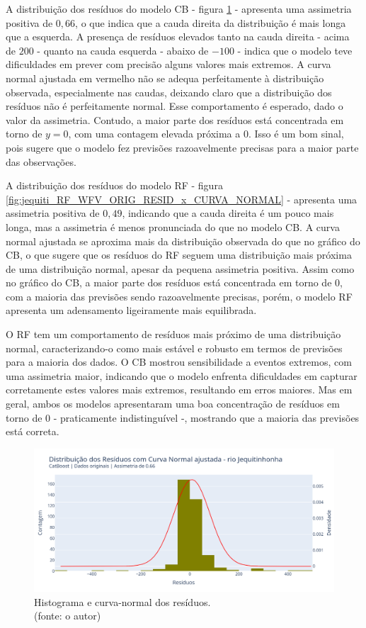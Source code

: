 A distribuição dos resíduos do modelo CB - figura \ref{fig:jequiti_CB_WFV_ORIG_RESID_x_CURVA_NORMAL} - apresenta uma assimetria positiva de $0,66$, o que indica que a cauda direita da distribuição é mais longa que a esquerda. A presença de resíduos elevados tanto na cauda direita - acima de $200$ - quanto na cauda esquerda - abaixo de $-100$ - indica que o modelo teve dificuldades em prever com precisão alguns valores mais extremos. A curva normal ajustada em vermelho não se adequa perfeitamente à distribuição observada, especialmente nas caudas, deixando claro que a distribuição dos resíduos não é perfeitamente normal. Esse comportamento é esperado, dado o valor da assimetria. Contudo, a maior parte dos resíduos está concentrada em torno de $y=0$, com uma contagem elevada próxima a $0$. Isso é um bom sinal, pois sugere que o modelo fez previsões razoavelmente precisas para a maior parte das observações.

A distribuição dos resíduos do modelo RF - figura \ref{fig:jequiti_RF_WFV_ORIG_RESID_x_CURVA_NORMAL} - apresenta uma assimetria positiva de $0,49$, indicando que a cauda direita é um pouco mais longa, mas a assimetria é menos pronunciada do que no modelo CB. A curva normal ajustada se aproxima mais da distribuição observada do que no gráfico do CB, o que sugere que os resíduos do RF seguem uma distribuição mais próxima de uma distribuição normal, apesar da pequena assimetria positiva. Assim como no gráfico do CB, a maior parte dos resíduos está concentrada em torno de $0$, com a maioria das previsões sendo razoavelmente precisas, porém, o modelo RF apresenta um adensamento ligeiramente mais equilibrada.

O RF tem um comportamento de resíduos mais próximo de uma distribuição normal, caracterizando-o como mais estável e robusto em termos de previsões para a maioria dos dados. O CB mostrou sensibilidade a eventos extremos, com uma assimetria maior, indicando que o modelo enfrenta dificuldades em capturar corretamente estes valores mais extremos, resultando em erros maiores. Mas em geral, ambos os modelos apresentaram uma boa concentração de resíduos em torno de $0$ - praticamente indistinguível -, mostrando que a maioria das previsões está correta.

\begin{figure}[!h]
\centering
\includegraphics[scale=0.33]{Figuras/jequiti/wfv/CB/CB_WFV_ORIG_RESID_x_CURVA_NORMAL.png}
\caption{Histograma e curva-normal dos resíduos.\\(fonte: o autor)}
\label{fig:jequiti_CB_WFV_ORIG_RESID_x_CURVA_NORMAL}
\end{figure}

